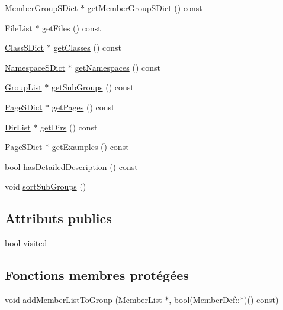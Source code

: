 \begin{DoxyCompactItemize}
\item 
\hyperlink{class_member_group_s_dict}{Member\+Group\+S\+Dict} $\ast$ \hyperlink{class_group_def_a054e45fa98c67941f87d083aecd9981f}{get\+Member\+Group\+S\+Dict} () const 
\item 
\hyperlink{class_file_list}{File\+List} $\ast$ \hyperlink{class_group_def_a684809cf44ad6e55ec0295533fb457f7}{get\+Files} () const 
\item 
\hyperlink{class_class_s_dict}{Class\+S\+Dict} $\ast$ \hyperlink{class_group_def_aeb6b1579a28ea20d0647511762669784}{get\+Classes} () const 
\item 
\hyperlink{class_namespace_s_dict}{Namespace\+S\+Dict} $\ast$ \hyperlink{class_group_def_a18fbee0bc9b55fa9f3af3a6a200b15f5}{get\+Namespaces} () const 
\item 
\hyperlink{class_group_list}{Group\+List} $\ast$ \hyperlink{class_group_def_affa8a4221a3abc49df46e879ec4ee911}{get\+Sub\+Groups} () const 
\item 
\hyperlink{class_page_s_dict}{Page\+S\+Dict} $\ast$ \hyperlink{class_group_def_ae36901516d5a0c11d4cae00107ab14b1}{get\+Pages} () const 
\item 
\hyperlink{class_dir_list}{Dir\+List} $\ast$ \hyperlink{class_group_def_adf4b183e698998f02332279d06d6a664}{get\+Dirs} () const 
\item 
\hyperlink{class_page_s_dict}{Page\+S\+Dict} $\ast$ \hyperlink{class_group_def_a15fdcd8c9a56dda4abb270fc4c23ba84}{get\+Examples} () const 
\item 
\hyperlink{qglobal_8h_a1062901a7428fdd9c7f180f5e01ea056}{bool} \hyperlink{class_group_def_a5e8c280a069ba176e7d11c85516c62f0}{has\+Detailed\+Description} () const 
\item 
void \hyperlink{class_group_def_a4df309532742545e812bedd9e1656712}{sort\+Sub\+Groups} ()
\end{DoxyCompactItemize}
\subsection*{Attributs publics}
\begin{DoxyCompactItemize}
\item 
\hyperlink{qglobal_8h_a1062901a7428fdd9c7f180f5e01ea056}{bool} \hyperlink{class_group_def_aea366de5d581d83de1217487b598b66b}{visited}
\end{DoxyCompactItemize}
\subsection*{Fonctions membres protégées}
\begin{DoxyCompactItemize}
\item 
void \hyperlink{class_group_def_aa5358a8ca2d0a45c201e91be5647538e}{add\+Member\+List\+To\+Group} (\hyperlink{class_member_list}{Member\+List} $\ast$, \hyperlink{qglobal_8h_a1062901a7428fdd9c7f180f5e01ea056}{bool}(Member\+Def\+::$\ast$)() const)
\end{DoxyCompactItemize}
